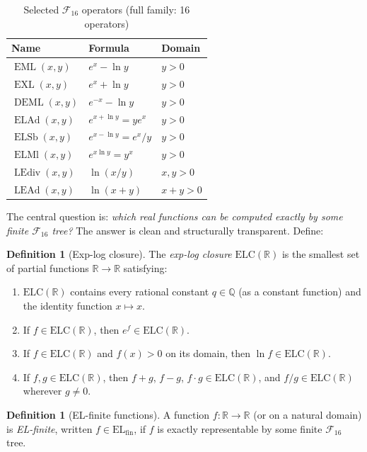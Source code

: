 \documentclass[12pt,a4paper]{article}
\theoremstyle{definition}
\newtheorem{definition}[theorem]{Definition}
\newcommand{\EML}{\operatorname{EML}}
\newcommand{\EXL}{\operatorname{EXL}}
\newcommand{\DEML}{\operatorname{DEML}}
\newcommand{\ELAd}{\operatorname{ELAd}}
\newcommand{\ELSb}{\operatorname{ELSb}}
\newcommand{\ELMl}{\operatorname{ELMl}}
\newcommand{\LEdiv}{\operatorname{LEdiv}}
\newcommand{\LEAd}{\operatorname{LEAd}}
\newcommand{\F}{\mathcal{F}_{16}}
\newcommand{\ELfin}{\mathrm{EL}_{\mathrm{fin}}}
\newcommand{\ELC}{\mathrm{ELC}(\mathbb{R})}
\newcommand{\R}{\mathbb{R}}
\newcommand{\Q}{\mathbb{Q}}
\begin{document}
\begin{table}[h]
\centering
\caption{Selected $\F$ operators (full family: 16 operators)}
\label{tab:f16}
\begin{tabular}{@{}lll@{}}
\toprule
Name & Formula & Domain \\
\midrule
$\EML(x,y)$   & $e^x - \ln y$         & $y > 0$ \\
$\EXL(x,y)$   & $e^x + \ln y$         & $y > 0$ \\
$\DEML(x,y)$  & $e^{-x} - \ln y$      & $y > 0$ \\
$\ELAd(x,y)$  & $e^{x+\ln y} = y e^x$ & $y > 0$ \\
$\ELSb(x,y)$  & $e^{x-\ln y} = e^x/y$ & $y > 0$ \\
$\ELMl(x,y)$  & $e^{x\ln y} = y^x$    & $y > 0$ \\
$\LEdiv(x,y)$ & $\ln(x/y)$            & $x,y > 0$ \\
$\LEAd(x,y)$  & $\ln(x+y)$            & $x+y > 0$ \\
\bottomrule
\end{tabular}
\end{table}

The central question is: \emph{which real functions can be computed exactly by
some finite $\F$ tree?}  The answer is clean and structurally transparent.
Define:

\begin{definition}[Exp-log closure]
\label{def:elc}
The \emph{exp-log closure} $\ELC$ is the smallest set of partial functions
$\R\to\R$ satisfying:
\begin{enumerate}
  \item[(i)]   $\ELC$ contains every rational constant $q\in\Q$ (as a constant
               function) and the identity function $x\mapsto x$.
  \item[(ii)]  If $f\in\ELC$, then $e^f\in\ELC$.
  \item[(iii)] If $f\in\ELC$ and $f(x)>0$ on its domain, then $\ln f\in\ELC$.
  \item[(iv)]  If $f,g\in\ELC$, then $f+g$, $f-g$, $f\cdot g\in\ELC$, and
               $f/g\in\ELC$ wherever $g\neq 0$.
\end{enumerate}
\end{definition}

\begin{definition}[EL-finite functions]
\label{def:elfin}
A function $f:\R\to\R$ (or on a natural domain) is \emph{EL-finite},
written $f\in\ELfin$, if $f$ is exactly representable by some finite $\F$ tree.
\end{definition}
\end{document}
